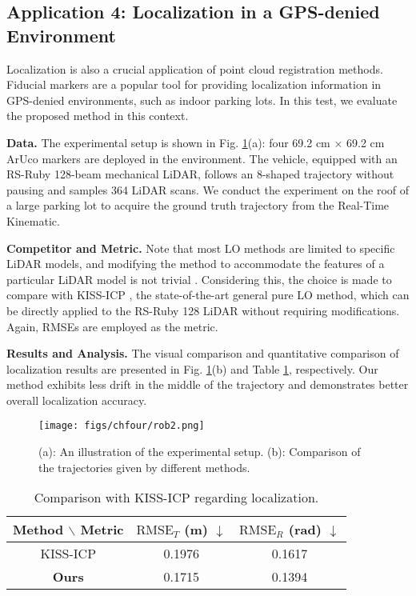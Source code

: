 \subsection{Application 4: Localization in a GPS-denied Environment} \label{test4}
Localization is also a crucial application of point cloud registration methods. Fiducial markers are a popular tool for providing localization information in GPS-denied environments, such as indoor parking lots. In this test, we evaluate the proposed method in this context. \par
\noindent\textbf{Data.}
The experimental setup is shown in Fig. \ref{rob}(a): four 69.2 cm $\times$ 69.2 cm ArUco \cite{aruco} markers are deployed in the environment. The vehicle, equipped with an RS-Ruby 128-beam mechanical LiDAR, follows an 8-shaped trajectory without pausing and samples 364 LiDAR scans. We conduct the experiment on the roof of a large parking lot to acquire the ground truth trajectory from the Real-Time Kinematic.  \par
\noindent\textbf{Competitor and Metric.}
Note that most LO methods are limited to specific LiDAR models, and modifying the method to accommodate the features of a particular LiDAR model is not trivial \cite{lloam}. 
%
Considering this, the choice is made to compare with KISS-ICP \cite{kiss}, the state-of-the-art general pure LO method, which can be directly applied to the RS-Ruby 128 LiDAR without requiring modifications. Again, RMSEs are employed as the metric.\par
\noindent\textbf{Results and Analysis.}
The visual comparison and quantitative comparison of localization results are presented in Fig. \ref{rob}(b) and Table \ref{outtab}, respectively. Our method exhibits less drift in the middle of the trajectory and demonstrates better overall localization accuracy.
\begin{figure}[H] 
	\centering
\texttt{[image: figs/chfour/rob2.png]}
	\caption{(a): An illustration of the experimental setup. (b): Comparison of the trajectories given by different methods.}
	\label{rob}
\end{figure}

\begin{table}[th]

\caption{Comparison with KISS-ICP \cite{kiss} regarding localization. }
	\centering
		\begin{tabular}{c|c|c}
			\hline\hline
				Method $\backslash$ Metric & $\mathrm{RMSE}_{T}$ (m) $\downarrow$ & $\mathrm{RMSE}_{R}$ (rad) $\downarrow$\\ \hline
   KISS-ICP \cite{kiss} & 0.1976 & 0.1617  \\ \hline
   \textbf{Ours} & 0.1715 & 0.1394
\\ \hline  \hline
		\end{tabular}
		\label{outtab}
\end{table}

